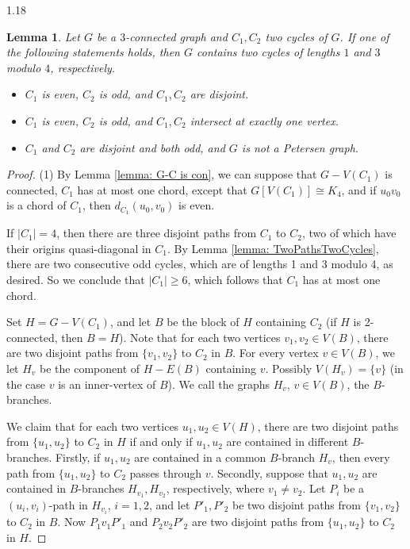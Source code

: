 \documentclass[10pt]{article}
\newtheorem{lemma}[theorem]{Lemma}
\begin{document}
\begin{spacing}{1.18}
\begin{lemma}\label{lemma: TwoCycleEvenOdd}
    Let $G$ be a $3$-connected graph and $C_1, C_2$ two cycles of $G$. If one of the following statements holds, then $G$ contains two cycles of lengths $1$ and $3$ modulo $4$, respectively.
    \begin{itemize}
        \item[(1)] $C_1$ is even, $C_2$ is odd, and $C_1,C_2$ are disjoint.
        \item[(2)] $C_1$ is even, $C_2$ is odd, and $C_1,C_2$ intersect at exactly one vertex.
        \item[(3)] $C_1$ and $C_2$ are disjoint and both odd, and $G$ is not a Petersen graph.
    \end{itemize}
\end{lemma}

\begin{proof}
    (1) By Lemma \ref{lemma: G-C is con}, we can suppose that $G-V(C_1)$ is connected, $C_1$ has at most one chord, except that $G[V(C_1)]\cong K_4$, and if $u_0v_0$ is a chord of $C_1$, then $d_{C_1}(u_0,v_0)$ is even.

    If $|C_1|=4$, then there are three disjoint paths from $C_1$ to $C_2$, two of which have their origins quasi-diagonal in $C_1$. By Lemma \ref{lemma: TwoPathsTwoCycles}, there are two consecutive odd cycles, which are of lengths 1 and 3 modulo 4, as desired. So we conclude that $|C_1|\geqslant 6$, which follows that $C_1$ has at most one chord. 

    Set $H=G-V(C_1)$, and let $B$ be the block of $H$ containing $C_2$ (if $H$ is 2-connected, then $B=H$). Note that for each two vertices $v_1,v_2\in V(B)$, there are two disjoint paths from $\{v_1,v_2\}$ to $C_2$ in $B$. For every vertex $v\in V(B)$, we let $H_v$ be the component of $H-E(B)$ containing $v$. Possibly $V(H_v)=\{v\}$ (in the case $v$ is an inner-vertex of $B$). We call the graphs $H_v$, $v\in V(B)$, the $B$-branches.

    We claim that for each two vertices $u_1,u_2\in V(H)$, there are two disjoint paths from $\{u_1,u_2\}$ to $C_2$ in $H$ if and only if $u_1,u_2$ are contained in different $B$-branches. Firstly, if $u_1,u_2$ are contained in a common $B$-branch $H_v$, then every path from $\{u_1,u_2\}$ to $C_2$ passes through $v$. Secondly, suppose that $u_1,u_2$ are contained in $B$-branches $H_{v_1},H_{v_2}$, respectively, where $v_1\neq v_2$. Let $P_i$ be a $(u_i,v_i)$-path in $H_{v_i}$, $i=1,2$, and let $P'_1,P'_2$ be two disjoint paths from $\{v_1,v_2\}$ to $C_2$ in $B$. Now $P_1v_1P'_1$ and $P_2v_2P'_2$ are two disjoint paths from $\{u_1,u_2\}$ to $C_2$ in $H$.


\end{proof}
\end{spacing}
\end{document}
